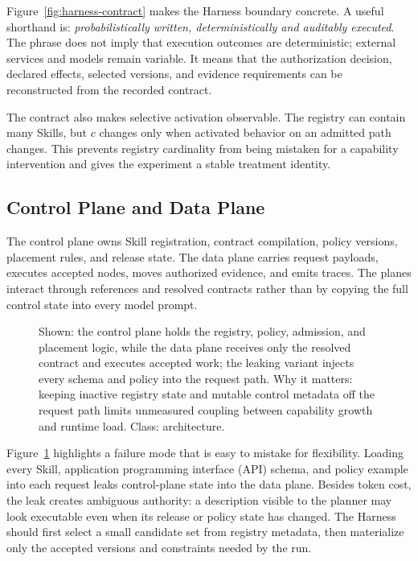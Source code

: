 Figure~\ref{fig:harness-contract} makes the Harness boundary concrete. A useful shorthand is: \textit{probabilistically written, deterministically and auditably executed}. The phrase does not imply that execution outcomes are deterministic; external services and models remain variable. It means that the authorization decision, declared effects, selected versions, and evidence requirements can be reconstructed from the recorded contract.

The contract also makes selective activation observable. The registry can contain many Skills, but $c$ changes only when activated behavior on an admitted path changes. This prevents registry cardinality from being mistaken for a capability intervention and gives the experiment a stable treatment identity.

\subsection{Control Plane and Data Plane}
\label{sec:manageability}

The control plane owns Skill registration, contract compilation, policy versions, placement rules, and release state. The data plane carries request payloads, executes accepted nodes, moves authorized evidence, and emits traces. The planes interact through references and resolved contracts rather than by copying the full control state into every model prompt.

\begin{figure}[t]
\centering
\caption{Shown: the control plane holds the registry, policy, admission, and placement logic, while the data plane receives only the resolved contract and executes accepted work; the leaking variant injects every schema and policy into the request path. Why it matters: keeping inactive registry state and mutable control metadata off the request path limits unmeasured coupling between capability growth and runtime load. Class: architecture.}
\label{fig:control-data}
\end{figure}

Figure~\ref{fig:control-data} highlights a failure mode that is easy to mistake for flexibility. Loading every Skill, application programming interface (API) schema, and policy example into each request leaks control-plane state into the data plane. Besides token cost, the leak creates ambiguous authority: a description visible to the planner may look executable even when its release or policy state has changed. The Harness should first select a small candidate set from registry metadata, then materialize only the accepted versions and constraints needed by the run.

